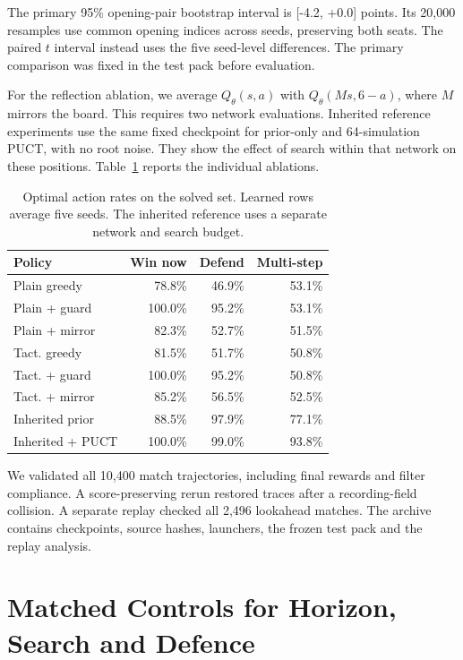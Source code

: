 \documentclass[letterpaper]{article}
\begin{document}
The primary 95\% opening-pair bootstrap interval is [-4.2, +0.0] points. Its 20,000 resamples use common opening indices across seeds, preserving both seats. The paired $t$ interval instead uses the five seed-level differences. The primary comparison was fixed in the test pack before evaluation.

For the reflection ablation, we average $Q_\theta(s,a)$ with
$Q_\theta(Ms,6-a)$, where $M$ mirrors the board. This requires two network
evaluations. Inherited reference experiments use the same fixed
checkpoint for prior-only and 64-simulation PUCT, with no root noise.
They show the effect of search within that network on these positions.
Table~\ref{tab:tactical-oracle} reports the individual ablations.

\begin{table}[!htbp]
\centering\small
\caption{Optimal action rates on the solved set. Learned rows average five seeds. The inherited reference uses a separate network and search budget.}
\label{tab:tactical-oracle}
\begin{tabular}{@{}lrrr@{}}
\toprule
Policy & Win now & Defend & Multi-step\\
\midrule
Plain greedy & 78.8\% & 46.9\% & 53.1\%\\
Plain + guard & 100.0\% & 95.2\% & 53.1\%\\
Plain + mirror & 82.3\% & 52.7\% & 51.5\%\\
Tact. greedy & 81.5\% & 51.7\% & 50.8\%\\
Tact. + guard & 100.0\% & 95.2\% & 50.8\%\\
Tact. + mirror & 85.2\% & 56.5\% & 52.5\%\\
Inherited prior & 88.5\% & 97.9\% & 77.1\%\\
Inherited + PUCT & 100.0\% & 99.0\% & 93.8\%\\
\bottomrule
\end{tabular}
\end{table}

We validated all 10,400 match trajectories, including final rewards and filter compliance.
A score-preserving rerun restored traces after a recording-field collision. A separate replay checked all 2,496 lookahead matches. The archive contains checkpoints, source hashes, launchers, the frozen test pack and the replay analysis.

\section{Matched Controls for Horizon, Search and Defence}
\label{app:final-controls}
\end{document}
